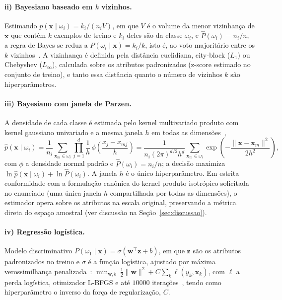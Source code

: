 \documentclass[11pt,a4paper]{article}
\begin{document}
\paragraph{ii) Bayesiano baseado em $k$ vizinhos.} Estimando $p(\mathbf{x}\mid\omega_i)=k_i/(n_iV)$, em que $V$ é
o volume da menor vizinhança de $\mathbf{x}$ que contém $k$ exemplos de treino e $k_i$ deles são da classe
$\omega_i$, e $\hat P(\omega_i)=n_i/n$, a regra de Bayes se reduz a $P(\omega_i\mid\mathbf{x})=k_i/k$, isto é,
ao voto majoritário entre os $k$ vizinhos~\cite{duda2001pattern,cover1967nearest}. A vizinhança é definida
pela distância euclidiana, city-block ($L_1$) ou Chebyshev ($L_\infty$), calculada sobre os atributos
padronizados (z-score estimado no conjunto de treino), e tanto essa distância quanto o número de vizinhos $k$ são
hiperparâmetros.

\paragraph{iii) Bayesiano com janela de Parzen.} A densidade de cada classe é estimada pelo kernel multivariado
produto com kernel gaussiano univariado e a mesma janela $h$ em todas as dimensões~\cite{parzen1962estimation,duda2001pattern},
\begin{equation}
\hat p(\mathbf{x}\mid\omega_i)=\frac{1}{n_i}\sum_{\mathbf{x}_m\in\omega_i}\prod_{j=1}^{d}\frac{1}{h}\,
\phi\!\left(\frac{x_j-x_{mj}}{h}\right)
=\frac{1}{n_i(2\pi)^{d/2}h^d}\sum_{\mathbf{x}_m\in\omega_i}\exp\!\left(-\frac{\lVert\mathbf{x}-\mathbf{x}_m\rVert^2}{2h^2}\right),
\end{equation}
com $\phi$ a densidade normal padrão e $\hat P(\omega_i)=n_i/n$; a decisão maximiza
$\ln\hat p(\mathbf{x}\mid\omega_i)+\ln\hat P(\omega_i)$. A janela $h$ é o único hiperparâmetro. Em estrita conformidade com a formulação canônica do 
kernel produto isotrópico solicitada no enunciado (uma única janela $h$ compartilhada por todas as dimensões), o estimador opera sobre os atributos na 
escala original, preservando a métrica direta do espaço amostral (ver discussão na Seção~\ref{sec:discussao}).

\paragraph{iv) Regressão logística.} Modelo discriminativo
$P(\omega_1\mid\mathbf{x})=\sigma(\mathbf{w}^\top\mathbf{z}+b)$, em que $\mathbf{z}$ são os atributos padronizados
no treino e $\sigma$ é a função logística, ajustado por máxima verossimilhança penalizada~\cite{hastie2009elements}:
$\min_{\mathbf{w},b}\ \tfrac12\lVert\mathbf{w}\rVert^2+C\sum_k\ell(y_k,\mathbf{x}_k)$, com $\ell$ a perda logística,
otimizador L-BFGS e até $\num{10000}$ iterações~\cite{pedregosa2011scikit}, tendo como hiperparâmetro o
inverso da força de regularização, $C$.
\end{document}

